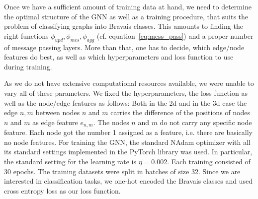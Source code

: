 \label{sec:implGNNBravais}
Once we have a sufficient amount of training data at hand, we need to determine the optimal structure of the GNN as well as
a training procedure, that suits the problem of classifying graphs into Bravais classes. 
This amounts to finding the right functions $\phi_{upd},\phi_{mes},\phi_{agg}$ (cf. equation~\ref{eq:mess_pass}) 
and a proper number of message passing layers. More than that, one has to decide, which edge/node features 
do best, as well as which hyperparameters and loss function to use during training.

As we do not have extensive computational resources available, we were unable to vary all of these parameters.
We fixed the hyperparameters, the loss function as well as the node/edge features as follows: 
Both in the 2d and in the 3d case the edge ${n,m}$ between nodes $n$ and $m$ 
carries the difference of the positions of nodes $n$ and $m$ as edge feature $e_{n,m}$.
The nodes $n$ and $m$ do not carry any specific node feature. Each node got the number 1 assigned as 
a feature, i.e. there are basically no node features.
For training the GNN, the standard NAdam optimizer with all its standard settings implemented in the PyTorch library was used.
In particular, the standard setting for the learning rate is $\eta=0.002$.
Each training consisted of 30 epochs. The training datasets were split in batches of size 32.
Since we are interested in classification tasks, we one-hot encoded the Bravais classes and used cross entropy loss as our loss function.

